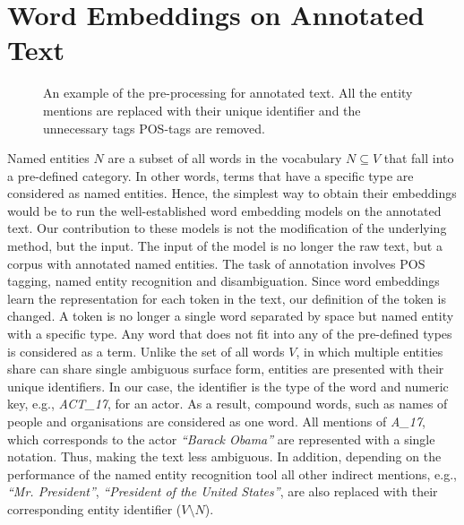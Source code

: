 \section{Word Embeddings on Annotated Text}\label{sec:annotated}
\begin{figure}
\centering 
\resizebox{0.85\textwidth}{0.28\textwidth}{      

}
\caption{An example of the pre-processing for annotated text. All the entity mentions are replaced with their unique identifier and the unnecessary tags POS-tags are removed.}
\label{fig:annotation}
\end{figure}
Named entities $N$ are a subset of all words in the vocabulary $N\subseteq V$ that fall into a pre-defined category.
In other words, terms that have a specific type are considered as named entities. Hence, the simplest way to obtain their embeddings would be to run the well-established word embedding models on the annotated text. Our contribution to these models is not the modification of the underlying method, but the input. The input of the model is no longer the raw text, but a corpus with annotated named entities. The task of annotation involves POS tagging, named entity recognition and disambiguation.
Since word embeddings learn the representation for each token in the text, our definition of the token is changed. A token is no longer a single word separated by space but named entity with a specific type. Any word that does not fit into any of the pre-defined types is considered as a term. Unlike the set of all words $V$, in which multiple entities share can share single ambiguous surface form, entities are presented with their unique identifiers. In our case, the identifier is the type of the word and numeric key, e.g., \emph{ACT\_17}, for an actor. As a result, compound words, such as names of people and organisations are considered as one word. All mentions of \emph{A\_17}, which corresponds to the actor \emph{``Barack Obama''} are represented with a single notation.
Thus, making the text less ambiguous.
In addition, depending on the performance of the named entity recognition tool all other indirect mentions, e.g., \emph{``Mr. President''}, \emph{``President of the United States''}, are also replaced with their corresponding entity identifier ($V\setminus  N$).
